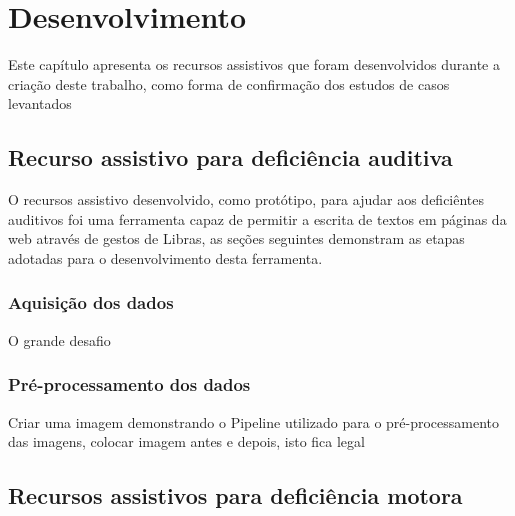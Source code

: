 \newpage
\chapter{Desenvolvimento}
\label{ch:desenvolvimento}

Este capítulo apresenta os recursos assistivos que foram desenvolvidos durante a criação deste trabalho, como forma de confirmação dos estudos de casos levantados 


\section{Recurso assistivo para deficiência auditiva}

O recursos assistivo desenvolvido, como protótipo, para ajudar aos deficiêntes auditivos foi uma ferramenta capaz de permitir a escrita de textos em páginas da web através de gestos de Libras, as seções seguintes demonstram as etapas adotadas para o desenvolvimento desta ferramenta.

\subsection{Aquisição dos dados}

O grande desafio 

\subsection{Pré-processamento dos dados} 



\par Criar uma imagem demonstrando o Pipeline utilizado para o pré-processamento das imagens, colocar imagem antes e depois, isto fica legal

\section{Recursos assistivos para deficiência motora}



